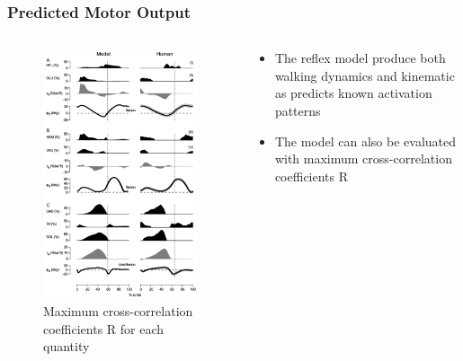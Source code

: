 \documentclass[10pt]{beamer}
\begin{document}
\begin{frame}
	\frametitle{Predicted Motor Output}
	
	\begin{columns}
		\begin{column}{.5\textwidth}
			\begin{figure}
				\centering
				\includegraphics[height=.75\textheight]{images/graphic_4.pdf}
				\caption{Maximum cross-correlation coefficients R for each quantity}	
			\end{figure}
		\end{column}
		\begin{column}{.5\textwidth}
			\begin{itemize}
				\item The reflex model produce both walking dynamics and kinematic as predicts known activation patterns
				\item The model can also be evaluated with maximum cross-correlation coefficients R
			\end{itemize}
		\end{column}
	\end{columns}
\end{frame}
\end{document}
